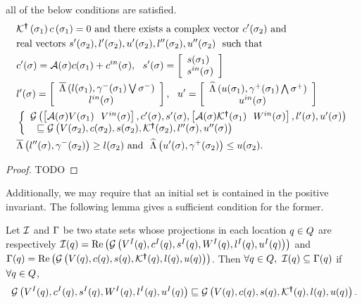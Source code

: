 \begin{lemma}
\begin{enumerate}
  all of the below conditions are satisfied.
\begin{align}~\label{eqn:edgeinv}
\begin{split}
& \mathcal{K}^{\bm{\dagger}}\left(\sigma_{1}\right)c\left(\sigma_{1}\right) =
  0~\text{and there exists a complex
  vector}~c^\prime(\sigma_{2})~\text{and}\\
& \text{real
    vectors}~s^\prime(\sigma_{2}),l^\prime(\sigma_{2}),u^\prime(\sigma_{2}),l^{\prime\prime}(\sigma_{2}),u^{\prime\prime}(\sigma_{2})~~\text{such
  that}\\
& c^\prime(\sigma) = \mathcal{A}(\sigma)c(\sigma_{1})+c^{in}(\sigma),~~s^\prime(\sigma) =
  \left[\begin{array}{l}{s(\sigma_{1})}\\{s^{in}(\sigma)} \end{array}\right]\\
& l^\prime(\sigma) =
  \left[\begin{array}{l}{\overline{\Lambda}\left(l(\sigma_{1}),\gamma^-(\sigma_{1})\bigvee\sigma^-\right)}\\{~~~~~~~~~l^{in}(\sigma)~~~} \end{array}\right],~~u^\prime =
  \left[\begin{array}{l}{\widehat{\Lambda}\left(u(\sigma_{1}),\gamma^+(\sigma_{1})\bigwedge\sigma^+\right)}\\{~~~~~~~~~u^{in}(\sigma)~~~} \end{array}\right]\\
& \left\{\begin{array}{l}{\mathcal{G}\left(\left[\mathcal{A}(\sigma)V(\sigma_{1})~~V^{in}(\sigma)\right],c^\prime(\sigma),s^\prime(\sigma),\left[\mathcal{A}(\sigma)\mathcal{K}^{\bm{\dagger}}(\sigma_{1})~~W^{in}(\sigma)\right],l^\prime(\sigma),u^\prime(\sigma)\right)}\\{~~\sqsubseteq \mathcal{G}\left(V(\sigma_{2}),c(\sigma_{2}),s(\sigma_{2}),\mathcal{K}^{\bm{\dagger}}(\sigma_{2}),l^{\prime\prime}(\sigma),u^{\prime\prime}(\sigma)\right)} \end{array}\right.\\
& \overline{\Lambda}\left(l^{\prime\prime}(\sigma),\gamma^-(\sigma_{2})\right)\geq l(\sigma_{2})~\text{and}~~
\widehat{\Lambda}\left(u^\prime(\sigma),\gamma^+(\sigma_{2})\right)\leq u(\sigma_{2}).
\end{split}
\end{align}
\end{enumerate}
\end{lemma}
\begin{proof}
{\color{red} TODO}
\end{proof}

Additionally, we may require that an initial set is contained in the
positive invariant.  The following lemma gives a sufficient condition
for the former.
\begin{lemma}
  Let $\mathcal{I}$ and $\Gamma$ be two state sets whose projections in
  each location $q\in Q$ are respectively
  $\mathcal{I}(q)=\operatorname{\operatorname{Re}}\left(\mathcal{G}\left(V^I(q),c^I(q),s^I(q),W^I(q),l^I(q),u^I(q)\right)\right)$
  and $\Gamma(q) =
  \operatorname{\operatorname{Re}}\left(\mathcal{G}\left(V(q),c(q),s(q),\mathcal{K}^{\bm{\dagger}}(q),l(q),u(q)\right)\right)$.
  Then $\forall q\in Q,~\mathcal{I}(q)\subseteq
  \Gamma(q)$ if $\forall q\in Q$,
\begin{align}~\label{eqn:initcont}
\mathcal{G}\left(V^I(q),c^I(q),s^I(q),W^I(q),l^I(q),u^I(q)\right)\sqsubseteq\mathcal{G}\left(V(q),c(q),s(q),\mathcal{K}^{\bm{\dagger}}(q),l(q),u(q)\right).
\end{align}
\end{lemma}


